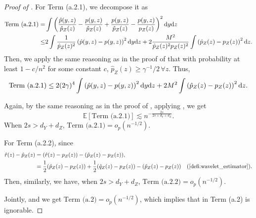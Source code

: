 \documentclass{article}
\theoremstyle{plain}
\theoremstyle{definition}
\def\EE{\mathbb{E}}
\theoremstyle{plain}
\newcommand{\diff}{{\rm d}}
\def\EE{\mathbb{E}}
\begin{document}
\begin{proof}[Proof of ]
For Term (a.2.1), we decompose it as
\begin{align}\label{proof:eq:a.2.1}
\begin{split}
    \text{Term (a.2.1)} 
    =& \int  \left(\frac{\hat p(y,z)}{\hat p_Z(z)} - \frac{p(y,z)}{\hat p_Z(z)}  +  \frac{p(y,z)}{\hat p_Z(z)} - \frac{p(y,z)}{p_Z(z)} \right)^2 \diff y\diff z\\
    \le & 2  \int \frac{1}{\hat p_Z(z)^2} \left(\hat p(y,z)-p(y,z)\right)^2 \diff y\diff z + 2\frac{M^2}{\hat p_Z(z)^2 p_Z(z)^2} \int  \left(\hat p_Z(z)-p_Z(z)\right)^2 \diff z.
    \end{split}
\end{align}
Then, we apply the same reasoning as in the proof of  that with probability at least $1 - c / n^2$ for some constant $c$, $\hat p_Z(z) \geq \gamma^{-1}/2\,\forall z$. Thus,
\[
    \text{Term (a.2.1)} \leq 2 (2\gamma)^4   \int \left(\hat p(y,z)-p(y,z)\right)^2 \diff y\diff z + 2M^2 \int  \left(\hat p_Z(z)-p_Z(z)\right)^2 \diff z.
\]

Again, by the same reasoning as in the proof of , applying , we get 
\[
    \EE[\text{Term (a.2.1)}] \lesssim n^{-\frac{2s}{2s + d_Y + d_Z}}.
\]
When $2s > d_Y + d_Z$, $\text{Term (a.2.1)} = o_p(n^{-1/2})$.

For Term (a.2.2), since 
\begin{align*}
    \hat r(z) -\hat p_Z(z) &= (\hat r(z) - p_Z(z)) -(\hat p_Z(z)-p_Z(z)),\\
    &= \frac{1}{2}(\hat p_Z(z) - p_Z(z)) + \frac{1}{2}(\hat q_Z(z) - p_Z(z)) -(\hat p_Z(z)-p_Z(z)) & (\text{\Cref{defi:wavelet_estimator}}).
\end{align*}
Then, similarly, we have, when $2s > d_Y + d_Z$, $\text{Term (a.2.2)} = o_p(n^{-1/2})$.

Jointly, and we get $\text{Term (a.2)} = o_p(n^{-1/2})$, 
which implies that in Term (a.2) is ignorable.



\end{proof}
\end{document}
